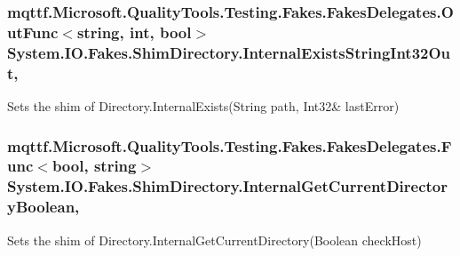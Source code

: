 \hypertarget{class_system_1_1_i_o_1_1_fakes_1_1_shim_directory_aab4b55c6bfa6fd782a7db1b96e2d7e80}{
\subsubsection[{Internal\-Exists\-String\-Int32\-Out}]{\setlength{\rightskip}{0pt plus 5cm}mqttf.\-Microsoft.\-Quality\-Tools.\-Testing.\-Fakes.\-Fakes\-Delegates.\-Out\-Func$<$string, int, bool$>$ System.\-I\-O.\-Fakes.\-Shim\-Directory.\-Internal\-Exists\-String\-Int32\-Out\hspace{0.3cm}{\ttfamily [static]}, {\ttfamily [set]}}}\label{class_system_1_1_i_o_1_1_fakes_1_1_shim_directory_aab4b55c6bfa6fd782a7db1b96e2d7e80}


Sets the shim of Directory.\-Internal\-Exists(String path, Int32\& last\-Error)

\hypertarget{class_system_1_1_i_o_1_1_fakes_1_1_shim_directory_a527b47bfda34a6859dc470555d97b8e2}{
\subsubsection[{Internal\-Get\-Current\-Directory\-Boolean}]{\setlength{\rightskip}{0pt plus 5cm}mqttf.\-Microsoft.\-Quality\-Tools.\-Testing.\-Fakes.\-Fakes\-Delegates.\-Func$<$bool, string$>$ System.\-I\-O.\-Fakes.\-Shim\-Directory.\-Internal\-Get\-Current\-Directory\-Boolean\hspace{0.3cm}{\ttfamily [static]}, {\ttfamily [set]}}}\label{class_system_1_1_i_o_1_1_fakes_1_1_shim_directory_a527b47bfda34a6859dc470555d97b8e2}


Sets the shim of Directory.\-Internal\-Get\-Current\-Directory(\-Boolean check\-Host)

